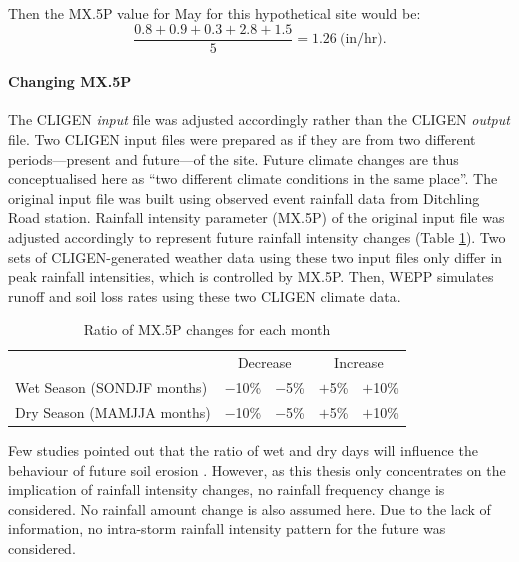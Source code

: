 Then the {MX.5P} value for May for this hypothetical site would be:
\begin{equation}
  \frac{0.8+0.9+0.3+2.8+1.5}{5} = 1.26 \ \textrm{(in/hr)}.
\end{equation}

\paragraph{Changing {MX.5P}} The CLIGEN \emph{input} file was adjusted
accordingly rather than the CLIGEN
\textit{output} file. Two CLIGEN input files were prepared as if they are from
two different periods---present and future---of the site. Future climate changes
are thus conceptualised here as ``two different climate conditions in the same
place''. The original input file was built using observed event rainfall data
from Ditchling Road station. Rainfall intensity parameter ({MX.5P}) of the
original input file was adjusted accordingly to represent future rainfall
intensity changes (Table \ref{tab:MX5PChanges}). Two sets of CLIGEN-generated
weather data using these two input files only differ in peak rainfall
intensities, which is controlled by {MX.5P}. Then, WEPP simulates runoff and
soil
loss rates using these two CLIGEN climate data.

\begin{table}[htpb]
  \centering
  \caption{Ratio of {MX.5P} changes for each month}
  \label{tab:MX5PChanges}
    \begin{tabular}{lcccc}
    \toprule
    & \multicolumn{2}{c}{Decrease} & \multicolumn{2}{c}{Increase} \\
    \cmidrule(r){2-3} \cmidrule(l){4-5}
    Wet Season (SONDJF months)   & $-$10\% &  $-$5\%  & $+$5\%  & $+$10\% \\
    Dry Season (MAMJJA months)   & $-$10\%  & $-$5\%  & $+$5\%  & $+$10\% \\
    \bottomrule
    \end{tabular}
\end{table}

Few studies pointed out that the ratio of wet and dry days will influence the
behaviour of future soil erosion
\citep{nearing2001-229,pruski2002-climate,pruski2002-7}. However, as this thesis
only concentrates on the implication of rainfall intensity changes, no rainfall
frequency change is considered. No rainfall amount change is also assumed here.
Due to the lack of information, no intra-storm rainfall intensity pattern for
the future was considered.

